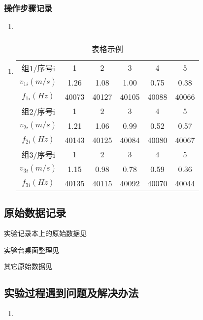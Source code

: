 \documentclass[dvipsnames, svgnames,a4paper,11pt]{article}
\begin{document}
	\subsubsection{操作步骤记录}
	\begin{enumerate}
		\item 
	\end{enumerate}	
	
	\subsubsection{}
	\begin{enumerate}
		\item \begin{table}[h]
			\centering
			\caption{表格示例}
			\label{tab:tab1}
			\begin{tabular}{|c|c|c|c|c|c|}
				\hline
				组1/序号i & 1 & 2 & 3 & 4 & 5 \\
				$v_{1i}(m/s)$ & 1.26 & 1.08 & 1.00 & 0.75 & 0.38 \\
				$f_{1i}(Hz)$ & 40073 & 40127 & 40105 & 40088 & 40066 \\
				\hline
				组2/序号i & 1 & 2 & 3 & 4 & 5 \\
				$v_{2i}(m/s)$ & 1.21 & 1.06 & 0.99 & 0.52 & 0.57 \\
				$f_{2i}(Hz)$ & 40143 & 40125 & 40084 & 40080 & 40067 \\
				\hline
				组3/序号i & 1 & 2 & 3 & 4 & 5 \\
				$v_{3i}(m/s)$ & 1.15 & 0.98 & 0.78 & 0.59 & 0.36 \\
				$f_{3i}(Hz)$ & 40135 & 40115 & 40092 & 40070 & 40044 \\
				\hline
			\end{tabular}
		\end{table}		
	\end{enumerate}
	
	
	\clearpage
	\subsection{原始数据记录}
	实验记录本上的原始数据见%
	
	实验台桌面整理见%
	
	其它原始数据见%
	
	\subsection{实验过程遇到问题及解决办法}
	\begin{enumerate}
		\item 
	\end{enumerate}
	
\end{document}
